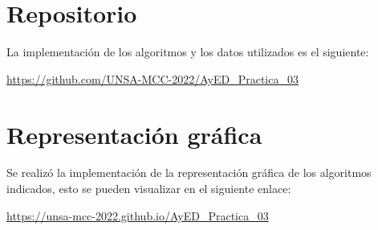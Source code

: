 \documentclass{article}
\begin{document}
    \section{Repositorio}\label{sec:codigo}
        La implementación de los algoritmos y los datos utilizados es el siguiente:\par
	    \par
	    \begin{center}
	        \url{https://github.com/UNSA-MCC-2022/AyED_Practica_03}
	    \end{center}

    \section{Representación gráfica}\label{sec:representacion}
        Se realizó la implementación de la representación gráfica de los algoritmos indicados, esto se pueden visualizar en el siguiente enlace:\par
	    \par
	    \begin{center}
	        \url{https://unsa-mcc-2022.github.io/AyED_Practica_03}
	    \end{center}
	
		
	
\end{document}
